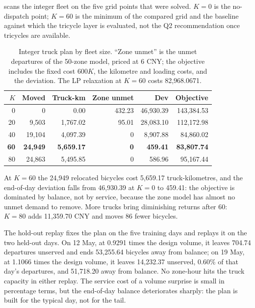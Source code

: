  scans the integer fleet on the five grid points that were solved.
$K=0$ is the no-dispatch point; $K=60$ is the minimum of the compared grid and the
baseline against which the tricycle layer is evaluated, not the Q2 recommendation
once tricycles are available.

\begin{table}[htbp]
\centering
\footnotesize
\caption[Integer truck scan]{Integer truck plan by fleet size. ``Zone unmet'' is
the unmet departures of the 50-zone model, priced at 6 CNY; the objective includes the
fixed cost $600K$, the kilometre and loading costs, and the deviation. The LP relaxation
at $K=60$ costs 82,968.0671.}
\label{tab:q2scan}
\scriptsize
\begin{tabular}{@{}rrrrrr@{}}
\toprule
$K$ & \textbf{Moved} & \textbf{Truck-km} & \textbf{Zone unmet} & \textbf{Dev} &
\textbf{Objective} \\
\midrule
0  & 0      & 0.00     & 432.23 & 46,930.39 & 143,384.53 \\
20 & 9,503  & 1,767.02 & 95.01  & 28,083.10 & 112,172.98 \\
40 & 19,104 & 4,097.39 & 0      & 8,907.88  & 84,860.02 \\
\textbf{60} & \textbf{24,949} & \textbf{5,659.17} & \textbf{0} &
\textbf{459.41} & \textbf{83,807.74} \\
80 & 24,863 & 5,495.85 & 0      & 586.96    & 95,167.44 \\
\bottomrule
\end{tabular}
\end{table}

At $K=60$ the 24,949 relocated bicycles cost
5,659.17 truck-kilometres, and the end-of-day deviation falls from 46,930.39 at $K=0$
to 459.41: the objective is dominated by balance, not by service, because the zone
model has almost no unmet demand to remove. More trucks bring diminishing returns
after 60: $K=80$ adds 11,359.70 CNY and moves 86 fewer bicycles.

The hold-out replay fixes the plan on the five training days and replays it on the
two held-out days. On 12 May, at
0.9291 times the design volume, it leaves 704.74 departures unserved and ends
53,255.64 bicycles away from balance; on 19 May, at 1.1066 times the design volume, it
leaves 14,232.37 unserved, 0.60\% of that day's departures, and 51,718.20 away from
balance. No zone-hour hits the truck capacity in either replay. The service cost of a
volume surprise is small in percentage terms, but the end-of-day balance deteriorates
sharply: the plan is built for the typical day, not for the tail.

